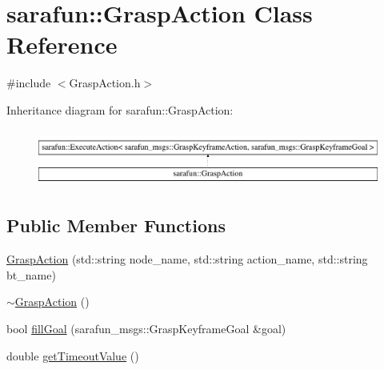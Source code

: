 \hypertarget{classsarafun_1_1GraspAction}{\section{sarafun\-:\-:Grasp\-Action Class Reference}
\label{classsarafun_1_1GraspAction}
}


{\ttfamily \#include $<$Grasp\-Action.\-h$>$}

Inheritance diagram for sarafun\-:\-:Grasp\-Action\-:\begin{figure}[H]
\begin{center}
\leavevmode
\includegraphics[height=1.901528cm]{classsarafun_1_1GraspAction}
\end{center}
\end{figure}
\subsection*{Public Member Functions}
\begin{DoxyCompactItemize}
\item 
\hyperlink{classsarafun_1_1GraspAction_ae3eed6fe11388023bab8316803759ac5}{Grasp\-Action} (std\-::string node\-\_\-name, std\-::string action\-\_\-name, std\-::string bt\-\_\-name)
\item 
\hyperlink{classsarafun_1_1GraspAction_aeb09ce6ab575e2653bfb88aa62b09361}{$\sim$\-Grasp\-Action} ()
\item 
bool \hyperlink{classsarafun_1_1GraspAction_a7418fe9de5024a8fbbfe8e5f5336d66f}{fill\-Goal} (sarafun\-\_\-msgs\-::\-Grasp\-Keyframe\-Goal \&goal)
\item 
double \hyperlink{classsarafun_1_1GraspAction_a406d5c86b5f788537c5af9d125724a55}{get\-Timeout\-Value} ()
\end{DoxyCompactItemize}


